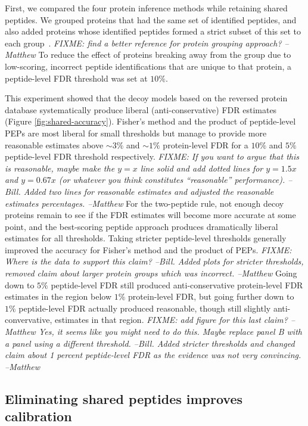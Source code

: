 \documentclass{article}
\begin{document}
First, we compared the four protein inference methods while retaining
shared peptides. We grouped proteins that had the same set of
identified peptides, and also added proteins whose identified peptides
formed a strict subset of this set to each
group~\cite{serang2012review}.  {\em FIXME: find a better reference
  for protein grouping approach? --Matthew} To reduce the effect of
proteins breaking away from the group due to low-scoring, incorrect
peptide identifications that are unique to that protein, a
peptide-level FDR threshold was set at $10\%$.

This experiment showed that the decoy models based on the reversed 
protein database systematically produce liberal (anti-conservative) 
FDR estimates (Figure \ref{fig:shared-accuracy}). Fisher's method and 
the product of peptide-level PEPs are most liberal for small 
thresholds but manage to provide more reasonable estimates above $\sim 
3\%$ and $\sim 1\%$ protein-level FDR for a $10\%$ and $5\%$ 
peptide-level FDR threshold respectively. {\em FIXME: If you want to 
argue that this is reasonable, maybe make the $y=x$ line solid and add 
dotted lines for $y=1.5x$ and $y=0.67x$ (or whatever you think 
constitutes ``reasonable'' performance). --Bill. Added two lines for 
reasonable estimates and adjusted the reasonable estimates 
percentages. --Matthew} For the two-peptide rule, not enough decoy 
proteins remain to see if the FDR estimates will become more accurate 
at some point, and the best-scoring peptide approach produces 
dramatically liberal estimates for all thresholds. Taking stricter 
peptide-level thresholds generally improved the accuracy for 
Fisher's method and the product of PEPs. {\em FIXME: Where is the 
data to support this claim? --Bill. Added plots for stricter 
thresholds, removed claim about larger protein groups which was 
incorrect. --Matthew} Going down to $5\%$ peptide-level FDR still 
produced anti-conservative protein-level FDR estimates in the region 
below $1\%$ protein-level FDR, but going further down to $1\%$ 
peptide-level FDR actually produced reasonable, though still slightly 
anti-convervative, estimates in that region. {\em FIXME: add figure 
for this last claim? --Matthew Yes, it seems like you might need to do 
this. Maybe replace panel B with a panel using a different threshold. 
--Bill. Added stricter thresholds and changed claim about 1 percent 
peptide-level FDR as the evidence was not very convincing. --Matthew}

\subsection*{Eliminating shared peptides improves calibration}
\end{document}

